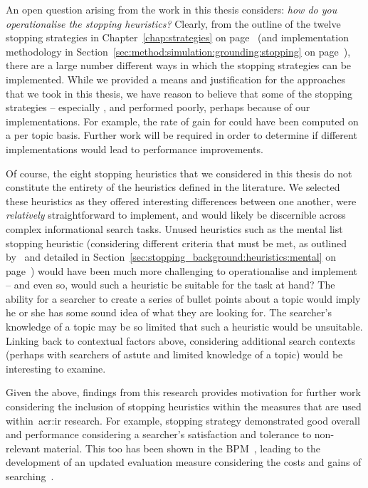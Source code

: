 An open question arising from the work in this thesis considers: \emph{how do you operationalise the stopping heuristics?} Clearly, from the outline of the twelve stopping strategies in Chapter~\ref{chap:strategies} on page~\pageref{chap:strategies} (and implementation methodology in Section~\ref{sec:method:simulation:grounding:stopping} on page~\pageref{sec:method:simulation:grounding:stopping}), there are a large number different ways in which the stopping strategies can be implemented. While we provided a means and justification for the approaches that we took in this thesis, we have reason to believe that some of the stopping strategies -- especially ,  and  performed poorly, perhaps because of our implementations. For example, the rate of gain for  could have been computed on a per topic basis. Further work will be required in order to determine if different implementations would lead to performance improvements.

Of course, the eight stopping heuristics that we considered in this thesis do not constitute the entirety of the heuristics defined in the literature. We selected these heuristics as they offered interesting differences between one another, were \emph{relatively} straightforward to implement, and would likely be discernible across complex informational search tasks. Unused heuristics such as the mental list stopping heuristic (considering different criteria that must be met, as outlined by~\cite{nickles1995judgment} and detailed in Section~\ref{sec:stopping_background:heuristics:mental} on page~\pageref{sec:stopping_background:heuristics:mental}) would have been much more challenging to operationalise and implement -- and even so, would such a heuristic be suitable for the task at hand? The ability for a searcher to create a series of bullet points about a topic would imply he or she has some sound idea of what they are looking for. The searcher's knowledge of a topic may be so limited that such a heuristic would be unsuitable. Linking back to contextual factors above, considering additional search contexts (perhaps with searchers of astute and limited knowledge of a topic) would be interesting to examine.

Given the above, findings from this research provides motivation for further work considering the inclusion of stopping heuristics within the measures that are used within~\gls{acr:ir} research. For example, stopping strategy  demonstrated good overall and performance considering a searcher's satisfaction and tolerance to non-relevant material. This too has been shown in the BPM~\citep{zhang2017bejewled}, leading to the development of an updated evaluation measure considering the costs and gains of searching~\citep{azzopardi2018cwl}.

